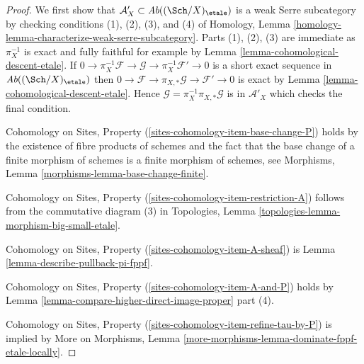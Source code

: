 \begin{proof}
We first show that $\mathcal{A}'_X \subset \textit{Ab}((\Sch/X)_\etale)$
is a weak Serre subcategory by checking conditions (1), (2), (3), and (4)
of Homology, Lemma \ref{homology-lemma-characterize-weak-serre-subcategory}.
Parts (1), (2), (3) are immediate as $\pi_X^{-1}$ is exact and
fully faithful for example by Lemma \ref{lemma-cohomological-descent-etale}. If
$0 \to \pi_X^{-1}\mathcal{F} \to \mathcal{G} \to \pi_X^{-1}\mathcal{F}' \to 0$
is a short exact sequence in $\textit{Ab}((\Sch/X)_\etale)$
then $0 \to \mathcal{F} \to \pi_{X, *}\mathcal{G} \to \mathcal{F}' \to 0$
is exact by Lemma \ref{lemma-cohomological-descent-etale}.
Hence $\mathcal{G} = \pi_X^{-1}\pi_{X, *}\mathcal{G}$ is in
$\mathcal{A}'_X$ which checks the final condition.

\medskip\noindent
Cohomology on Sites, Property (\ref{sites-cohomology-item-base-change-P}) holds
by the existence of fibre products of schemes
and the fact that the base change of a finite morphism of
schemes is a finite morphism of schemes, see
Morphisms, Lemma \ref{morphisms-lemma-base-change-finite}.

\medskip\noindent
Cohomology on Sites, Property (\ref{sites-cohomology-item-restriction-A})
follows from the commutative diagram (3) in
Topologies, Lemma \ref{topologies-lemma-morphism-big-small-etale}.

\medskip\noindent
Cohomology on Sites, Property (\ref{sites-cohomology-item-A-sheaf}) is
Lemma \ref{lemma-describe-pullback-pi-fppf}.

\medskip\noindent
Cohomology on Sites, Property (\ref{sites-cohomology-item-A-and-P}) holds by
Lemma \ref{lemma-compare-higher-direct-image-proper} part (4).

\medskip\noindent
Cohomology on Sites, Property (\ref{sites-cohomology-item-refine-tau-by-P})
is implied by
More on Morphisms, Lemma
\ref{more-morphisms-lemma-dominate-fppf-etale-locally}.
\end{proof}

